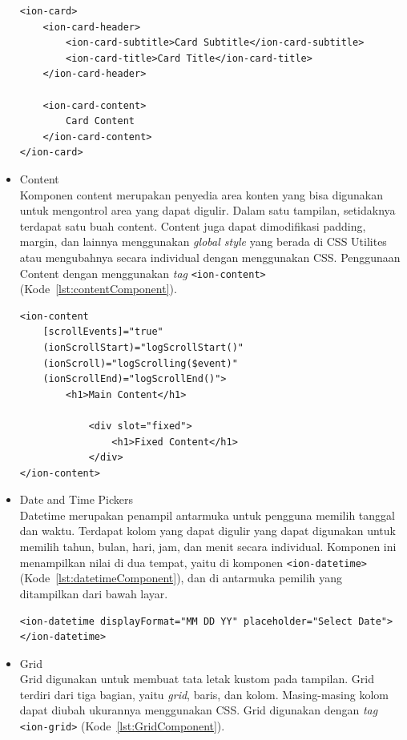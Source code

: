 \begin{itemize}
\begin{lstlisting}[label={lst:cardComponent}, caption=Potongan Kode Program dari Card Component]
<ion-card>
	<ion-card-header>
		<ion-card-subtitle>Card Subtitle</ion-card-subtitle>
		<ion-card-title>Card Title</ion-card-title>
	</ion-card-header>
				
	<ion-card-content>
		Card Content
	</ion-card-content>
</ion-card>
\end{lstlisting} 
	
	\item Content\\
	Komponen content merupakan penyedia area konten yang bisa digunakan untuk mengontrol area yang dapat digulir. Dalam satu tampilan, setidaknya terdapat satu buah content. Content juga dapat dimodifikasi padding, margin, dan lainnya menggunakan {\it global style} yang berada di CSS Utilites atau mengubahnya secara individual dengan menggunakan CSS. Penggunaan Content dengan menggunakan {\it tag} \texttt{<ion-content>} (Kode~\ref{lst:contentComponent}).

\begin{lstlisting}[label={lst:contentComponent}, caption=Potongan Kode Program dari Content Component]
<ion-content
	[scrollEvents]="true"
	(ionScrollStart)="logScrollStart()"
	(ionScroll)="logScrolling($event)"
	(ionScrollEnd)="logScrollEnd()">
		<h1>Main Content</h1>
			
			<div slot="fixed">
				<h1>Fixed Content</h1>
			</div>
</ion-content>
\end{lstlisting} 

	\item Date and Time Pickers\\
	Datetime merupakan penampil antarmuka untuk pengguna memilih tanggal dan waktu. Terdapat kolom yang dapat digulir yang dapat digunakan untuk memilih tahun, bulan, hari, jam, dan menit secara individual. Komponen ini menampilkan nilai di dua tempat, yaitu di komponen \texttt{<ion-datetime>} (Kode~\ref{lst:datetimeComponent}), dan di antarmuka pemilih yang ditampilkan dari bawah layar.
\begin{lstlisting}[label={lst:datetimeComponent}, caption=Kode Program dari Datetime Component dengan Format Bulan-Hari-Tahun]
<ion-datetime displayFormat="MM DD YY" placeholder="Select Date"></ion-datetime>
\end{lstlisting} 

	\item Grid \\
	Grid digunakan untuk membuat tata letak kustom pada tampilan. Grid terdiri dari tiga bagian, yaitu \textit{grid}, baris, dan kolom. Masing-masing kolom dapat diubah ukurannya menggunakan CSS. Grid digunakan dengan \textit{tag} \texttt{<ion-grid>} (Kode~\ref{lst:GridComponent}).	


\end{itemize}
